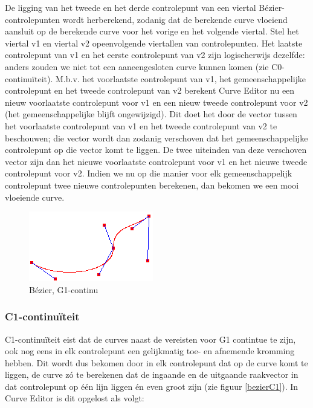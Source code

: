 \documentclass[a4paper,11pt,oneside, titlepage]{article}
\begin{document}
De ligging van het tweede en het derde controlepunt van een viertal B\'ezier-controlepunten wordt herberekend, zodanig dat de berekende curve vloeiend aansluit op de berekende curve voor het vorige en het volgende viertal. Stel het viertal v1 en viertal v2 opeenvolgende viertallen van controlepunten. Het laatste controlepunt van v1 en het eerste controlepunt van v2 zijn logischerwijs dezelfde: anders zouden we niet tot een aaneengesloten curve kunnen komen (zie C0-continu\"iteit). M.b.v. het voorlaatste controlepunt van v1, het gemeenschappelijke controlepunt en het tweede controlepunt van v2 berekent Curve Editor nu een nieuw voorlaatste controlepunt voor v1 en een nieuw tweede controlepunt voor v2 (het gemeenschappelijke blijft ongewijzigd). Dit doet het door de vector tussen het voorlaatste controlepunt van v1 en het tweede controlepunt van v2 te beschouwen; die vector wordt dan zodanig verschoven dat het gemeenschappelijke controlepunt op die vector komt te liggen. De twee uiteinden van deze verschoven vector zijn dan het nieuwe voorlaatste controlepunt voor v1 en het nieuwe tweede controlepunt voor v2. Indien we nu op die manier voor elk gemeenschappelijk controlepunt twee nieuwe controlepunten berekenen, dan bekomen we een mooi vloeiende curve.
\begin{figure}
\begin{center}
\includegraphics[scale=0.4]{./screenies2/bezierG1.png}
\caption{B\'ezier, G1-continu}\label{bexierG1}
\end{center}
\end{figure}
\subsubsection{C1-continu\"iteit \label{sC1}}
C1-continu\"iteit eist dat de curves naast de vereisten voor G1 contintue te zijn, ook nog eens in elk controlepunt een gelijkmatig toe- en afnemende kromming hebben. Dit wordt dus bekomen door in elk controlepunt dat op de curve komt te liggen, de curve z\'o te berekenen dat de ingaande en de uitgaande raakvector
in dat controlepunt op \'e\'en lijn liggen \'en even groot zijn (zie figuur \ref{bezierC1}). In Curve Editor is dit opgelost als volgt:
\end{document}
